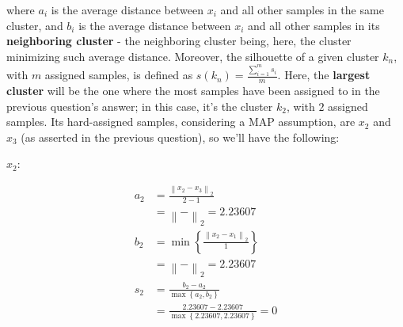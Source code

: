 \documentclass[12pt]{article}
\begin{document}
\begin{enumerate}[leftmargin=\labelsep]
\begin{enumerate}[leftmargin=\labelsep]
                where $a_i$ is the average distance between $x_i$ and all other samples
                in the same cluster, and $b_i$ is the average distance between $x_i$ and all
                other samples in its \textbf{neighboring cluster} - the neighboring
                cluster being, here, the cluster minimizing such average distance.
                Moreover, the silhouette of a given cluster $k_n$, with $m$ assigned samples,
                is defined as $s(k_n) = \frac{\sum_{i=1}^m s_i}{m}$.
                Here, the \textbf{largest cluster} will be the one where the most
                samples have been assigned to in the previous question's answer;
                in this case, it's the cluster $k_2$, with $2$ assigned samples.
                Its hard-assigned samples, considering a MAP assumption, are $x_2$
                and $x_3$ (as asserted in the previous question), so we'll have the following:

                \vspace*{0.5cm}

                \begin{paracol}{2}
                  \setlength{\columnseprule}{1pt}
                  \def\columnseprulecolor{\color{black}}
                  \centering

                  $x_2$:

                  \begin{equation*}
                    \begin{aligned}
                      a_2 & = \frac{\left\| x_2 - x_3 \right\|_2}{2 - 1}                             \\
                          & = \left\|  -  \right\|_2
                      = 2.23607                                                                      \\
                      b_2 & = \min\left\{\frac{\left\| x_2 - x_1 \right\|_2}{1}\right\}              \\
                          & = \left\|  -  \right\|_2
                      = 2.23607                                                                      \\
                      s_2 & = \frac{b_2 - a_2}{\max\left\{a_2, b_2\right\}}                          \\
                          & = \frac{2.23607 - 2.23607}{\max\left\{2.23607, 2.23607\right\}} = 0
                    \end{aligned}
                  \end{equation*}


\end{paracol}
\end{enumerate}
\end{enumerate}
\end{document}
